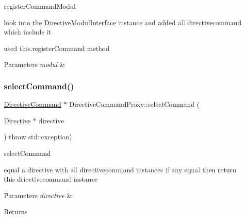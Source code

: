 register\+Command\+Modul 

look into the \hyperlink{classdirective_1_1DirectiveModulInterface}{Directive\+Modul\+Interface} instance and added all directivecommand which include it

used this.\+register\+Command method


\begin{DoxyParams}{Parameters}
{\em modul} & \\
\hline
\end{DoxyParams}
\mbox{\label{classdirective_1_1DirectiveCommandProxy_a6074c404a6680496e0aaf4181de99755}} 
\subsubsection{\texorpdfstring{select\+Command()}{selectCommand()}}
{\footnotesize\ttfamily \hyperlink{classdirective_1_1DirectiveCommand}{Directive\+Command} $\ast$ Directive\+Command\+Proxy\+::select\+Command (\begin{DoxyParamCaption}\item[{\hyperlink{classdirective_1_1Directive}{Directive} $\ast$}]{directive }\end{DoxyParamCaption}) throw  std\+::exception) }



select\+Command 

equal a directive with all directivecommand instances if any equal then return this driectivecommand instance 
\begin{DoxyParams}{Parameters}
{\em directive} & \\
\hline
\end{DoxyParams}
\begin{DoxyReturn}{Returns}

\end{DoxyReturn}
\mbox{\label{classdirective_1_1DirectiveCommandProxy_aa62a0facb8bd0f4d4ef041b5168078fe}} 
